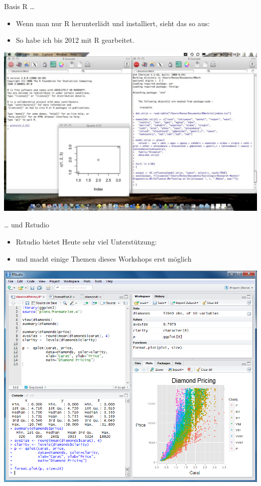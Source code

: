 \documentclass[ignorenonframetext,]{beamer}
\providecommand{\tightlist}{%
\setlength{\itemsep}{0pt}\setlength{\parskip}{0pt}}
\begin{document}
\begin{frame}{Basis R \ldots{}}

\begin{itemize}
\tightlist
\item
  Wenn man nur R herunterlädt und installiert, sieht das so aus:
\item
  So habe ich bis 2012 mit R gearbeitet.
\end{itemize}

\includegraphics{./tex2pdf.956/2c652796da602b9efe1dca344441c9ada66f4fde.jpg}

\end{frame}

\begin{frame}{\ldots{} und Rstudio}

\begin{itemize}
\tightlist
\item
  Rstudio bietet Heute sehr viel Unterstützung:
\item
  und macht einige Themen dieses Workshops erst möglich
\end{itemize}

\includegraphics{./tex2pdf.956/692f3658d35df168276cf46e3e083f908a5cc105.png}

\end{frame}
\end{document}
